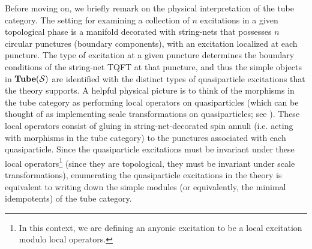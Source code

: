 
Before moving on, we briefly remark on the physical interpretation of the tube category. 
The setting for examining a collection of $n$ excitations in a given topological phase is a 
manifold decorated with string-nets that possesses $n$ circular punctures (boundary components), with an excitation localized at each puncture.
The type of excitation at a given puncture determines the boundary conditions of the string-net TQFT at that puncture, 
and thus the simple objects in $\textbf{Tube}(\mathcal{S})$ are identified with the distinct types of quasiparticle excitations that the theory supports. 
A helpful physical picture is to think of the morphisms in the tube category as performing local operators
on quasiparticles (which can be thought of as implementing scale transformations on quasiparticles; see \cite{Lan2014}). 
These local operators consist of gluing in string-net-decorated spin annuli (i.e. acting with morphisms in the tube category) to the 
punctures associated with each quasiparticle. 
Since the quasiparticle excitations must be invariant under these local operators\footnote{In this context, we are defining an anyonic excitation to be a local excitation modulo local operators.} (since they are 
topological, they must be invariant under scale transformations), 
enumerating the quasiparticle excitations in the theory is equivalent to writing down the simple 
modules (or equivalently, the minimal idempotents) of the tube category. 

